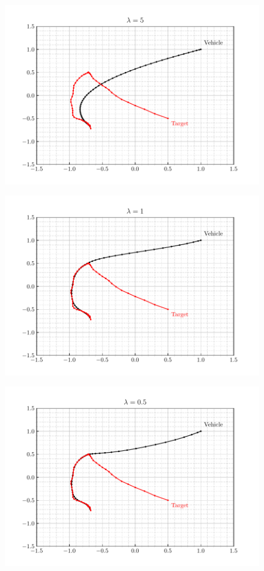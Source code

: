 \documentclass[12pt]{article}
\begin{document}
\begin{figure}[H]
    \centering
    \includegraphics{../../src/task_1/output/ex_1_i=2.pdf}
\end{figure}

\begin{figure}[H]
    \centering
    \includegraphics{../../src/task_1/output/ex_1_i=3.pdf}
\end{figure}

\begin{figure}[H]
    \centering
    \includegraphics{../../src/task_1/output/ex_1_i=4.pdf}
\end{figure}
\end{document}
